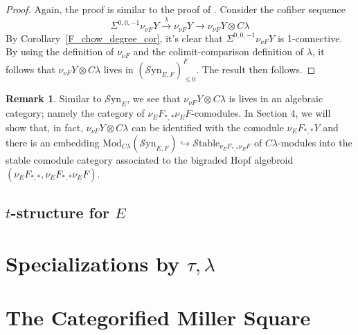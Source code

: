 \documentclass[10pt]{amsart}
\theoremstyle{definition}
\numberwithin{figure}{section}
\numberwithin{equation}{section}
\newtheorem{remark}[figure]{Remark}
\theoremstyle{cited}
\newcommand{\Mod}{\mathrm{Mod}}
\newcommand{\Syn}{\mathcal{S}\mathrm{yn}}
\newcommand{\Stable}{\mathcal{S}\mathrm{table}}
\begin{document}
\begin{proof}
   Again, the proof is similar to the proof of \cite[Lemma 4.29]{Pst22}. Consider the cofiber sequence
   $$
\Sigma^{0,0,-1}\nu_{\nu F}Y\xrightarrow{\lambda}\nu_{\nu F}Y\to \nu_{\nu F}Y\otimes C\lambda
   $$
   By Corollary~\ref{F_chow_degree_cor}, it's clear that $\Sigma^{0,0,-1}\nu_{\nu F}Y$ is 1-connective. By using the definition of $\nu_{\nu F}$ and the colimit-comparison definition of $\lambda$, it follows that $\nu_{\nu F}Y\otimes C\lambda$ lives in $(\Syn_{E,F})_{\leq 0}^F$. The result then follows.
\end{proof}

\begin{remark}
Similar to $\Syn_E$, we see that $\nu_{\nu F}Y\otimes C\lambda$ is lives in an algebraic category; namely the category of $\nu_EF_{*,*}\nu_E F$-comodules. In Section 4, we will show that, in fact, $\nu_{\nu F}Y\otimes C\lambda$ can be identified with the comodule $\nu_{E}F_{*,*}Y$ and there is an embedding $\Mod_{C\lambda}(\Syn_{E,F})\hookrightarrow \Stable_{\nu_EF_{*,*}\nu_EF}$ of $C\lambda$-modules into the stable comodule category associated to the bigraded Hopf algebroid $(\nu_EF_{*,*},\nu_EF_{*,*}\nu_EF)$.    
\end{remark}

\subsection{$t$-structure for $E$}
\label{E_tstruct_subsec}

\section{Specializations by $\tau,\lambda$}

\section{The Categorified Miller Square}
\end{document}

